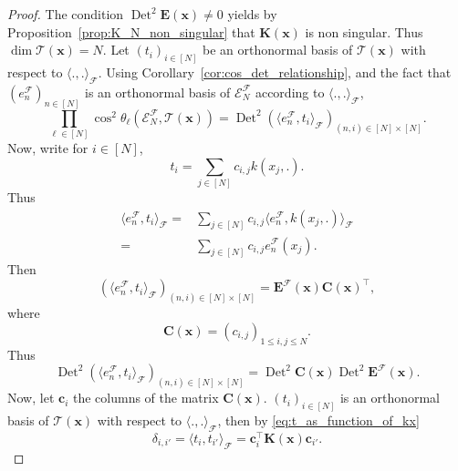\documentclass[twoside,11pt]{book}
\DeclareMathOperator{\Det}{Det}
\DeclareMathOperator{\Tran}{\intercal}
\begin{document}
\begin{proof}
The condition $\Det^{2} \bm{E}(\bm{x}) \neq 0$ yields by Proposition~\ref{prop:K_N_non_singular} that $\bm{K}(\bm{x})$ is non singular. Thus $\dim \mathcal{T}(\bm{x}) = N$. Let $(t_{i})_{i \in [N]}$ be an orthonormal basis of $\mathcal{T}(\bm{x})$ with respect to $\langle ., . \rangle_{\mathcal{F}}$.
%
Using Corollary~\ref{cor:cos_det_relationship}, and the fact that $(e_{n}^{\mathcal{F}})_{n \in [N]}$ is an orthonormal basis of $\mathcal{E}^{\mathcal{F}}_{N}$ according to $\langle ., . \rangle_{\mathcal{F}}$,
\begin{equation}\label{eq:prod_cos_det_E}
\prod\limits_{\ell \in [N]} \cos^{2} \theta_{\ell} \left(\mathcal{E}^{\mathcal{F}}_{N}, \mathcal{T}(\bm{x}) \right) = \Det^{2} (\langle e_{n}^{\mathcal{F}}, t_{i} \rangle_{\mathcal{F}})_{(n,i) \in [N]\times[N]}.
\end{equation}
Now, write for $i \in [N]$,
\begin{equation}\label{eq:t_as_function_of_kx}
t_{i} = \sum\limits_{j \in [N]} c_{i,j} k(x_{j},.).
\end{equation}
%
Thus
\begin{align}
\langle e_{n}^{\mathcal{F}}, t_{i} \rangle_{\mathcal{F}} = & \sum\limits_{j \in [N]} c_{i,j} \langle e_{n}^{\mathcal{F}}, k(x_{j},.) \rangle_{\mathcal{F}} \\
= &\sum\limits_{j \in [N]} c_{i,j}  e_{n}^{\mathcal{F}}(x_{j}).
\end{align}
%
Then
\begin{equation}
(\langle e_{n}^{\mathcal{F}}, t_{i} \rangle_{\mathcal{F}})_{(n,i) \in [N]\times[N]} = \bm{E}^{\mathcal{F}}(\bm{x}) \bm{C}(\bm{x})^{\Tran} ,
\end{equation}
where
\begin{equation}
\bm{C}(\bm{x}) = (c_{i,j})_{1 \leq i,j \leq N}.
\end{equation}
%
Thus
\begin{equation}\label{eq:AN_times_EN}
\Det^{2} (\langle e_{n}^{\mathcal{F}}, t_{i} \rangle_{\mathcal{F}})_{(n,i) \in [N]\times[N]} = \Det^{2} \bm{C}(\bm{x}) \Det^{2} \bm{E}^{\mathcal{F}}(\bm{x}).
\end{equation}
Now, let $\bm{c}_{i}$ the columns of the matrix $\bm{C}(\bm{x})$. $(t_{i})_{i \in [N]}$ is an orthonormal basis of $\mathcal{T}(\bm{x})$ with respect to $\langle .,. \rangle_{\mathcal{F}}$, then by \eqref{eq:t_as_function_of_kx}
\begin{equation}
  \delta_{i,i'} = \langle t_{i}, t_{i'} \rangle_{\mathcal{F}} = \bm{c}_{i}^{\Tran} \bm{K}(\bm{x}) \bm{c}_{i'}  .

\end{equation}
\end{proof}
\end{document}
